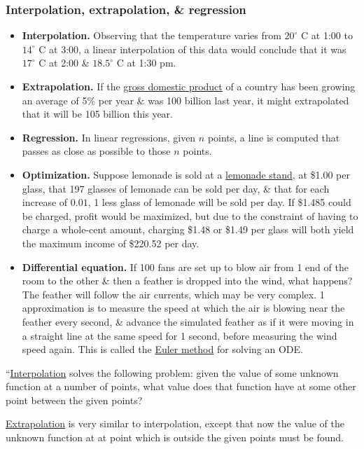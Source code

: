 \documentclass[oneside]{book}
\numberwithin{equation}{section}
\begin{document}
\subsubsection{Interpolation, extrapolation, \& regression}
\begin{itemize}
	\item \textsf{\textbf{Interpolation.} Observing that the temperature varies from $20^\circ$ C at 1:00 to $14^\circ$ C at 3:00, a linear interpolation of this data would conclude that it was $17^\circ$ C at 2:00 \& $18.5^\circ$ C at 1:30 pm.}
	\item \textsf{\textbf{Extrapolation.} If the \href{https://en.wikipedia.org/wiki/Gross_domestic_product}{gross domestic product} of a country has been growing an average of 5\% per year \& was 100 billion last year, it might extrapolated that it will be 105 billion this year.}
	\item \textsf{\textbf{Regression.} In linear regressions, given $n$ points, a line is computed that passes as close as possible to those $n$ points.}
	\item \textsf{\textbf{Optimization.} Suppose lemonade is sold at a \href{https://en.wikipedia.org/wiki/Lemonade_stand}{lemonade stand}, at \$1.00 per glass, that 197 glasses of lemonade can be sold per day, \& that for each increase of $0.01$, 1 less glass of lemonade will be sold per day. If \$1.485 could be charged, profit would be maximized, but due to the constraint of having to charge a whole-cent amount, charging \$1.48 or \$1.49 per glass will both yield the maximum income of \$220.52 per day.}
	\item \textsf{\textbf{Differential equation.} If 100 fans are set up to blow air from 1 end of the room to the other \& then a feather is dropped into the wind, what happens? The feather will follow the air currents, which may be very complex. 1 approximation is to measure the speed at which the air is blowing near the feather every second, \& advance the simulated feather as if it were moving in a straight line at the same speed for 1 second, before measuring the wind speed again. This is called the \href{https://en.wikipedia.org/wiki/Euler_method}{Euler method} for solving an ODE.}
\end{itemize}
``\href{https://en.wikipedia.org/wiki/Interpolation}{Interpolation} solves the following problem: given the value of some unknown function at a number of points, what value does that function have at some other point between the given points?

\href{https://en.wikipedia.org/wiki/Extrapolation}{Extrapolation} is very similar to interpolation, except that now the value of the unknown function at at point which is outside the given points must be found.
\end{document}
